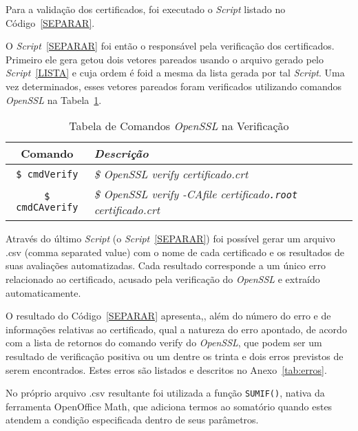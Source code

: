 	    Para a validação dos certificados, foi executado o \textit{Script} listado no Código~\ref{SEPARAR}.

	    
	    O \textit{Script}~\ref{SEPARAR} foi então o responsável pela verificação dos certificados. Primeiro ele gera  getou dois vetores pareados usando o arquivo gerado pelo \textit{Script}~\ref{LISTA} e cuja ordem é  foid a mesma da lista gerada por tal \textit{Script}. Uma vez determinados, esses vetores pareados foram verificados utilizando comandos \textit{OpenSSL} na Tabela~\ref{tab:cmds02}.

	    \begin{table}[h]
			\centering
			\caption{Tabela de Comandos \textit{OpenSSL} na Verificação}
			\label{tab:cmds02}
			\begin{tabular}{c>{\em}l}
			\toprule
			\textbf{Comando} & \textbf{Descrição} \\ \midrule
			\texttt{\$ cmdVerify} & \$ \textit{OpenSSL} verify certificado.crt \\ 
			\rowcolor[gray]{0.9}
			\texttt{\$ cmdCAverify} & \$ \textit{OpenSSL} verify -CAfile certificado\texttt{.root} certificado.crt \\
			\bottomrule
			\end{tabular}
		\end{table}
	    Através do último \textit{Script} (o \textit{Script}~\ref{SEPARAR}) foi possível gerar um arquivo .csv (comma separated value) com o nome de cada certificado e os resultados de suas avaliações automatizadas. Cada resultado corresponde a um único erro relacionado ao certificado, acusado pela verificação do \textit{OpenSSL} e extraído automaticamente.

    	O resultado do Código~\ref{SEPARAR} apresenta,, além do número do erro e de informações relativas ao certificado, qual a natureza do erro apontado, de acordo com a lista de retornos do comando verify do \textit{OpenSSL}, que podem ser um resultado de verificação positiva ou um dentre os trinta e dois erros previstos de serem encontrados. Estes erros são listados e descritos no Anexo~\ref{tab:erros}.

    	No próprio arquivo .csv resultante foi utilizada a função \texttt{SUMIF()}, nativa da ferramenta OpenOffice Math, que adiciona termos ao somatório quando estes atendem a condição especificada dentro de seus parâmetros.